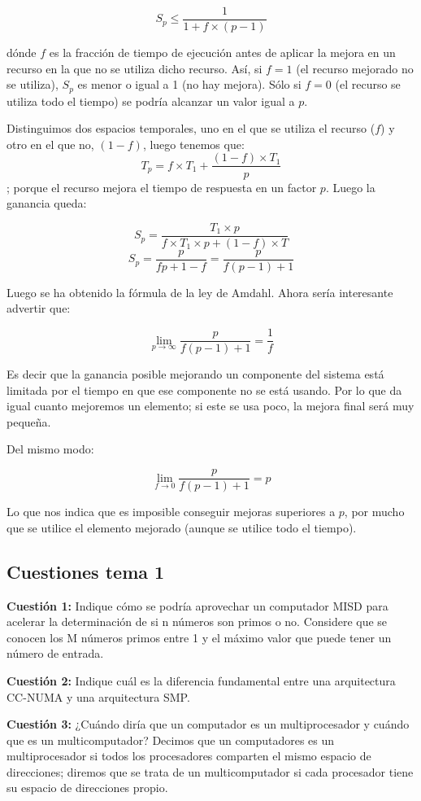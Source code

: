 \documentclass[a4paper, 11pt]{article}
\begin{document}
$$S_p \leq \frac{1}{1+f \times (p-1)} $$

dónde $f$ es la fracción de tiempo de ejecución antes de aplicar la mejora en un recurso en la que no se utiliza dicho recurso. Así, si $f=1$ (el recurso mejorado no se utiliza), $S_p$ es menor o igual a 1 (no hay mejora). Sólo si $f=0$ (el recurso se utiliza todo el tiempo) se podría alcanzar un valor igual a $p$.

Distinguimos dos espacios temporales, uno en el que se utiliza el recurso ($f$) y otro en el que no, $(1-f)$, luego tenemos que: 
$$T_p= f \times T_1 + \frac{(1-f) \times T_1}{p} $$; porque el recurso mejora el tiempo de respuesta en un factor $p$. Luego la ganancia queda:

$$S_p = \frac{ T_1 \times p}{f \times T_1 \times p + (1-f) \times T} $$ 
$$S_p = \frac{p}{fp+1-f} = \frac{p}{f(p-1)+1}$$ 

Luego se ha obtenido la fórmula de la ley de Amdahl. Ahora sería interesante advertir que:

$$\lim_{p\to\infty}\frac{p}{f(p-1)+1}=\frac{1}{f} $$

Es decir que la ganancia posible mejorando un componente del sistema está limitada por el tiempo en que ese componente no se está usando. Por lo que da igual cuanto mejoremos un elemento; si este se usa poco, la mejora final será muy pequeña. 

Del mismo modo: 

$$\lim_{f\to0}\frac{p}{f(p-1)+1}=p $$

Lo que nos indica que es imposible conseguir mejoras superiores a $p$, por mucho que se utilice el elemento mejorado (aunque se utilice todo el tiempo).


\subsection{Cuestiones tema 1}

\textbf{\large{\textcolor{BurntOrange}{Cuestión 1:}}}
\textsf{Indique cómo se podría aprovechar un computador MISD para acelerar la determinación de si n
	números son primos o no. Considere que se conocen los M números primos entre 1 y el máximo valor que
	puede tener un número de entrada.} 

\textbf{\large{\textcolor{BurntOrange}{Cuestión 2:}}}
\textsf{Indique cuál es la diferencia fundamental entre una arquitectura CC-NUMA y una arquitectura
	SMP. } 

\textbf{\large{\textcolor{BurntOrange}{Cuestión 3:}}}
\textsf{¿Cuándo diría que un computador es un multiprocesador y cuándo que es un multicomputador?} 
Decimos que un computadores es un multiprocesador si todos los procesadores comparten el mismo espacio de direcciones; diremos que se trata de un multicomputador si cada procesador tiene su espacio de direcciones propio. 
\end{document}
